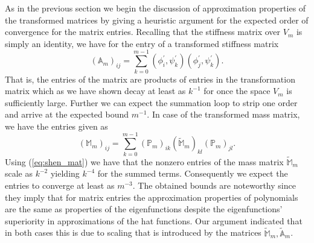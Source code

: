 \documentclass[a4paper,10pt]{article}
\newcommand{\inner}[2]{\ensuremath{\left(#1, #2\right)}}
\newcommand{\Ammatt}{\ensuremath{\tilde{\mathbb{A}}_m}}              %
\newcommand{\Mmmatt}{\ensuremath{\tilde{\mathbb{M}}_m}}              %
\newcommand{\Ammat}{\ensuremath{\mathbb{A}_m}}               %
\newcommand{\Mmmat}{\ensuremath{\mathbb{M}_m}}               %
\newcommand{\Pmat}{\ensuremath{\mathbb{P}_m}}                  %
\begin{document}
  As in the previous section we begin the discussion of approximation properties
  of the transformed matrices by giving a heuristic argument for the expected
  order of convergence for the matrix entries. Recalling that the stiffness matrix
  over $V_m$ is simply an identity, we have for the entry of a transformed
  stiffness matrix 
  \[
    \left(\Ammat\right)_{ij} =
    \displaystyle\sum\limits_{k=0}^{m-1}
    \inner{\phi^{\prime}_i}{\psi^{\prime}_k}
    \inner{\phi^{\prime}_j}{\psi^{\prime}_k}.
  \]
  That is, the entries of the matrix are products of entries in the 
  transformation matrix which as we have shown decay at least as $k^{-1}$ for
  once the space $V_m$ is sufficiently large. Further we can expect the summation
  loop to strip one order and arrive at the expected bound $m^{-1}$. In case of
  the transformed mass matrix, we have the entries given as
  \[
    \left(\Mmmat\right)_{ij} =
    \displaystyle\sum\limits_{k=0}^{m-1}
    \left(\Pmat\right)_{ik}
    \left(\Mmmatt\right)_{kl}
    \left(\Pmat\right)_{jl}.
  \]
  Using (\ref{eq:shen_mat}) we have that the nonzero entries of the mass matrix
  $\Mmmatt$ scale as $k^{-2}$ yielding $k^{-4}$ for the summed terms. Consequently
  we expect the entries to converge at least as $m^{-3}$. The obtained bounds
  are noteworthy since they imply that for matrix entries the approximation
  properties of polynomials are the same as properties of the eigenfunctions
  despite the eigenfunctions' superiority in approximations of the hat functions.
  Our argument indicated that in both cases this is due to scaling that is
  introduced by the matrices $\Mmmatt, \Ammatt$.
\end{document}
